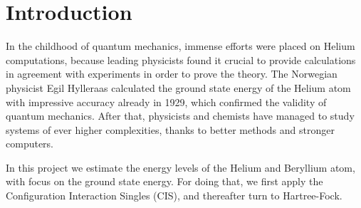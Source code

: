 \section{Introduction} \label{sec:introduction}
In the childhood of quantum mechanics, immense efforts were placed on Helium computations, because leading physicists found it crucial to provide calculations in agreement with experiments in order to prove the theory. The Norwegian physicist Egil Hylleraas calculated the ground state energy of the Helium atom with impressive accuracy already in 1929, which confirmed the validity of quantum mechanics. After that, physicists and chemists have managed to study systems of ever higher complexities, thanks to better methods and stronger computers.

In this project we estimate the energy levels of the Helium and Beryllium atom, with focus on the ground state energy. For doing that, we first apply the Configuration Interaction Singles (CIS), and thereafter turn to Hartree-Fock. 


